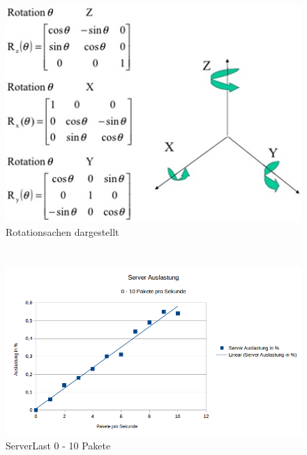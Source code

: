 \documentclass[a4paper]{spie}  %
\begin{document}
\begin{appendices}
\section{}
\begin{figure}[H]
	\centering
	\includegraphics[width=1\textwidth]{images/rotation}
	\caption{Rotationsachen dargestellt}
	\label{rotation}
\end{figure}

\section{}
\begin{figure}[H]
	\centering
	\includegraphics[width=1\textwidth]{images/ServerLast1.png}
	\caption{ServerLast 0 - 10 Pakete}
	\label{serverlast1}
\end{figure}


\end{appendices}
\end{document}
